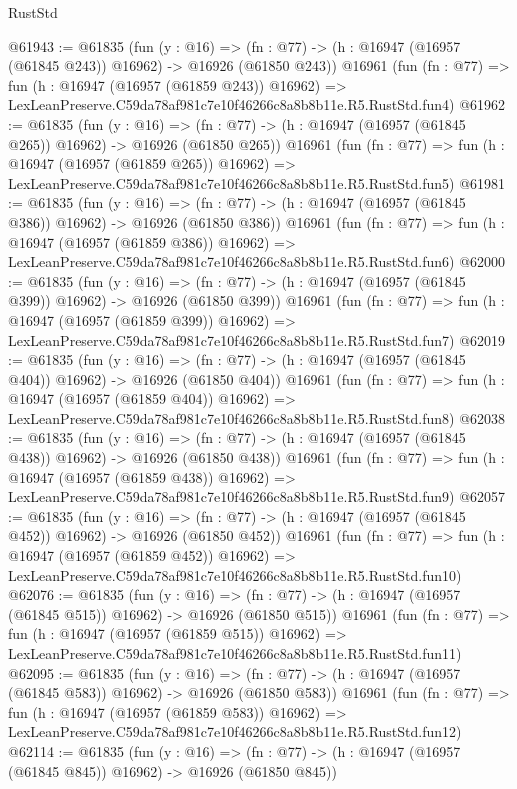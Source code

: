 \begin{lexlean}{RustStd}
\begin{coremodule}
@61943 := @61835
    (fun (y : @16) =>
    (fn : @77) -> (h : @16947 (@16957 (@61845 @243)) @16962) -> @16926 (@61850 @243))
    @16961
    (fun (fn : @77) =>
    fun (h : @16947 (@16957 (@61859 @243)) @16962) =>
    LexLeanPreserve.C59da78af981c7e10f46266c8a8b8b11e.R5.RustStd.fun4)
@61962 := @61835
    (fun (y : @16) =>
    (fn : @77) -> (h : @16947 (@16957 (@61845 @265)) @16962) -> @16926 (@61850 @265))
    @16961
    (fun (fn : @77) =>
    fun (h : @16947 (@16957 (@61859 @265)) @16962) =>
    LexLeanPreserve.C59da78af981c7e10f46266c8a8b8b11e.R5.RustStd.fun5)
@61981 := @61835
    (fun (y : @16) =>
    (fn : @77) -> (h : @16947 (@16957 (@61845 @386)) @16962) -> @16926 (@61850 @386))
    @16961
    (fun (fn : @77) =>
    fun (h : @16947 (@16957 (@61859 @386)) @16962) =>
    LexLeanPreserve.C59da78af981c7e10f46266c8a8b8b11e.R5.RustStd.fun6)
@62000 := @61835
    (fun (y : @16) =>
    (fn : @77) -> (h : @16947 (@16957 (@61845 @399)) @16962) -> @16926 (@61850 @399))
    @16961
    (fun (fn : @77) =>
    fun (h : @16947 (@16957 (@61859 @399)) @16962) =>
    LexLeanPreserve.C59da78af981c7e10f46266c8a8b8b11e.R5.RustStd.fun7)
@62019 := @61835
    (fun (y : @16) =>
    (fn : @77) -> (h : @16947 (@16957 (@61845 @404)) @16962) -> @16926 (@61850 @404))
    @16961
    (fun (fn : @77) =>
    fun (h : @16947 (@16957 (@61859 @404)) @16962) =>
    LexLeanPreserve.C59da78af981c7e10f46266c8a8b8b11e.R5.RustStd.fun8)
@62038 := @61835
    (fun (y : @16) =>
    (fn : @77) -> (h : @16947 (@16957 (@61845 @438)) @16962) -> @16926 (@61850 @438))
    @16961
    (fun (fn : @77) =>
    fun (h : @16947 (@16957 (@61859 @438)) @16962) =>
    LexLeanPreserve.C59da78af981c7e10f46266c8a8b8b11e.R5.RustStd.fun9)
@62057 := @61835
    (fun (y : @16) =>
    (fn : @77) -> (h : @16947 (@16957 (@61845 @452)) @16962) -> @16926 (@61850 @452))
    @16961
    (fun (fn : @77) =>
    fun (h : @16947 (@16957 (@61859 @452)) @16962) =>
    LexLeanPreserve.C59da78af981c7e10f46266c8a8b8b11e.R5.RustStd.fun10)
@62076 := @61835
    (fun (y : @16) =>
    (fn : @77) -> (h : @16947 (@16957 (@61845 @515)) @16962) -> @16926 (@61850 @515))
    @16961
    (fun (fn : @77) =>
    fun (h : @16947 (@16957 (@61859 @515)) @16962) =>
    LexLeanPreserve.C59da78af981c7e10f46266c8a8b8b11e.R5.RustStd.fun11)
@62095 := @61835
    (fun (y : @16) =>
    (fn : @77) -> (h : @16947 (@16957 (@61845 @583)) @16962) -> @16926 (@61850 @583))
    @16961
    (fun (fn : @77) =>
    fun (h : @16947 (@16957 (@61859 @583)) @16962) =>
    LexLeanPreserve.C59da78af981c7e10f46266c8a8b8b11e.R5.RustStd.fun12)
@62114 := @61835
    (fun (y : @16) =>
    (fn : @77) -> (h : @16947 (@16957 (@61845 @845)) @16962) -> @16926 (@61850 @845))

\end{coremodule}
\end{lexlean}
